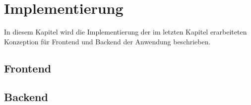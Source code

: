 \chapter{Implementierung}

In diesem Kapitel wird die Implementierung der im letzten Kapitel erarbeiteten
Konzeption für Frontend und Backend der Anwendung beschrieben.



\section{Frontend}










\section{Backend}








